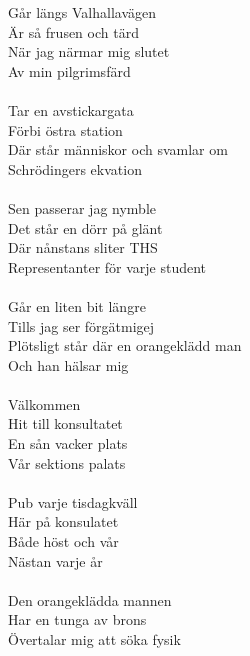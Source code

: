 \documentclass[a6paper, 10pt, twoside]{article}
\begin{document}

\begin{center}
\end{center}
\begin{lyrics}
Går längs Valhallavägen\\
Är så frusen och tärd\\
När jag närmar mig slutet\\
Av min pilgrimsfärd\\
\vspace{2pt}\\
Tar en avstickargata\\
Förbi östra station\\
Där står människor och svamlar om\\
Schrödingers ekvation\\
\vspace{2pt}\\
Sen passerar jag nymble\\
Det står en dörr på glänt\\
Där nånstans sliter THS\\
Representanter för varje student\\
\vspace{2pt}\\
Går en liten bit längre\\
Tills jag ser förgätmigej\\
Plötsligt står där en orangeklädd man\\
Och han hälsar mig\\
\vspace{2pt}\\
Välkommen \\
Hit till konsultatet\\
En sån vacker plats\\
Vår sektions palats\\
\vspace{2pt}\\
Pub varje tisdagkväll\\
Här på konsulatet\\
Både höst och vår \\
Nästan varje år\\
\vspace{2pt}\\
Den orangeklädda mannen\\
Har en tunga av brons\\
Övertalar mig att söka fysik\\

\end{lyrics}
\end{document}
